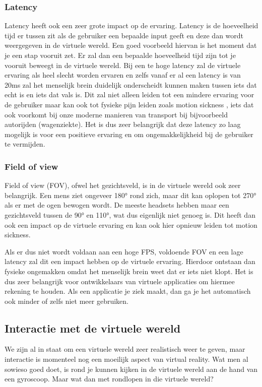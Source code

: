 \subsubsection{Latency}
\label{ssubsec:latency}
Latency heeft ook een zeer grote impact op de ervaring. Latency is de hoeveelheid tijd er tussen zit als de gebruiker een bepaalde input geeft en deze dan wordt weergegeven in de virtuele wereld. Een goed voorbeeld hiervan is het moment dat je een stap vooruit zet. Er zal dan een bepaalde hoeveelheid tijd zijn tot je vooruit beweegt in de virtuele wereld. Bij een te hoge latency zal de virtuele ervaring als heel slecht worden ervaren en zelfs vanaf er al een latency is van 20ms zal het menselijk brein duidelijk onderscheidt kunnen maken tussen iets dat echt is en iets dat vals is. Dit zal niet alleen leiden tot een mindere ervaring voor de gebruiker maar kan ook tot fysieke pijn leiden zoals motion sickness \autocite{Pappas2016}, iets dat ook voorkomt bij onze moderne manieren van transport bij bijvoorbeeld autorijden (wagenziekte). Het is dus zeer belangrijk dat deze latency zo laag mogelijk is voor een positieve ervaring en om ongemakkelijkheid bij de gebruiker te vermijden.

\subsubsection{Field of view}
\label{ssubsec:fov}
Field of view (FOV), ofwel het gezichtsveld, is in de virtuele wereld ook zeer belangrijk. Een mens ziet ongeveer 180° rond zich, maar dit kan oplopen tot 270° als er met de ogen bewogen wordt. De meeste headsets hebben maar een gezichtsveld tussen de 90° en 110°, wat dus eigenlijk niet genoeg is. Dit heeft dan ook een impact op de virtuele ervaring en kan ook hier opnieuw leiden tot motion sickness.

Als er dus niet wordt voldaan aan een hoge FPS, voldoende FOV en een lage latency zal dit  een impact hebben op de virtuele ervaring. Hierdoor ontstaan dan fysieke ongemakken omdat het menselijk brein weet dat er iets niet klopt. Het is dus zeer belangrijk voor ontwikkelaars van virtuele applicaties om hiermee rekening te houden. Als een applicatie je ziek maakt, dan ga je het automatisch ook minder of zelfs niet meer gebruiken.

\subsection{Interactie met de virtuele wereld}
\label{subsec:interactie-vr}
We  zijn al in staat om een virtuele wereld zeer realistisch weer te geven, maar interactie is momenteel nog een moeilijk aspect van virtual reality. Wat men al sowieso goed doet, is rond je kunnen kijken in de virtuele wereld aan de hand van een gyroscoop. Maar wat dan met rondlopen in die virtuele wereld?

